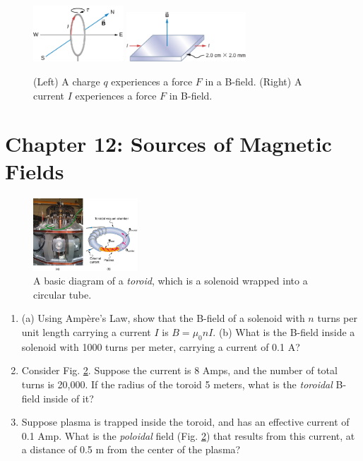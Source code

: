 \documentclass[10pt]{article}
\begin{document}
\begin{figure}[hb]
\centering
\includegraphics[width=0.3\textwidth]{torqueLoop.jpeg} \hspace{1cm}
\includegraphics[width=0.4\textwidth]{hallEffect1.jpeg}
\caption{\label{fig:chap11_2} (Left) A charge $q$ experiences a force $F$ in a B-field. (Right) A current $I$ experiences a force $F$ in B-field.}
\end{figure}

\section{Chapter 12: Sources of Magnetic Fields}

\begin{figure}[ht]
\centering
\includegraphics[width=0.35\textwidth,trim=8.5cm 1cm 0cm 3cm,clip=true]{toroid.jpeg}
\caption{\label{fig:chap12_1} A basic diagram of a \textit{toroid}, which is a solenoid wrapped into a circular tube.}
\end{figure}

\begin{enumerate}
\item (a) Using Amp\`{e}re's Law, show that the B-field of a solenoid with $n$ turns per unit length carrying a current $I$ is $B = \mu_0 n I$. (b) What is the B-field inside a solenoid with 1000 turns per meter, carrying a current of 0.1 A? \\ \vspace{1cm}
\item Consider Fig. \ref{fig:chap12_1}.  Suppose the current is 8 Amps, and the number of total turns is 20,000. If the radius of the toroid 5 meters, what is the \textit{toroidal} B-field inside of it? \\ \vspace{1cm}
\item Suppose plasma is trapped inside the toroid, and has an effective current of 0.1 Amp. What is the \textit{poloidal} field (Fig. \ref{fig:chap12_1}) that results from this current, at a distance of 0.5 m from the center of the plasma? \\ \vspace{1cm}
\end{enumerate}
\end{document}
